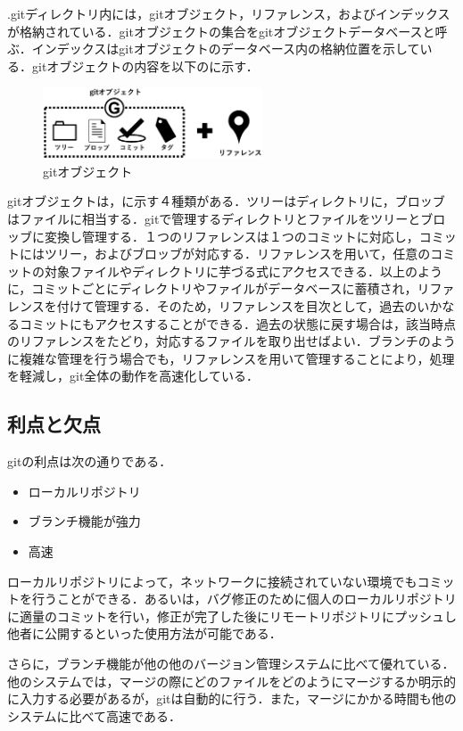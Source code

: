\documentclass[a4j,9pt,twocolumn]{jsarticle}
\begin{document}
.gitディレクトリ内には，gitオブジェクト，リファレンス，およびインデックスが格納されている．gitオブジェクトの集合をgitオブジェクトデータベースと呼ぶ．インデックスはgitオブジェクトのデータベース内の格納位置を示している．gitオブジェクトの内容を以下のに示す．

\begin{figure}[h]
\centering
\includegraphics[width=65mm]{img/git_obj2.eps}
\caption{gitオブジェクト}
\label{object2}
\end{figure}

gitオブジェクトは，に示す４種類がある．ツリーはディレクトリに，ブロッブはファイルに相当する．gitで管理するディレクトリとファイルをツリーとブロッブに変換し管理する．１つのリファレンスは１つのコミットに対応し，コミットにはツリー，およびブロッブが対応する．リファレンスを用いて，任意のコミットの対象ファイルやディレクトリに芋づる式にアクセスできる．以上のように，コミットごとにディレクトリやファイルがデータベースに蓄積され，リファレンスを付けて管理する．そのため，リファレンスを目次として，過去のいかなるコミットにもアクセスすることができる．過去の状態に戻す場合は，該当時点のリファレンスをたどり，対応するファイルを取り出せばよい．ブランチのように複雑な管理を行う場合でも，リファレンスを用いて管理することにより，処理を軽減し，git全体の動作を高速化している．

\subsection{利点と欠点}
gitの利点は次の通りである．

\begin{itemize}
\item ローカルリポジトリ
\item ブランチ機能が強力
\item 高速
\end{itemize}

ローカルリポジトリによって，ネットワークに接続されていない環境でもコミットを行うことができる．あるいは，バグ修正のために個人のローカルリポジトリに適量のコミットを行い，修正が完了した後にリモートリポジトリにプッシュし他者に公開するといった使用方法が可能である．

さらに，ブランチ機能が他の他のバージョン管理システムに比べて優れている．他のシステムでは，マージの際にどのファイルをどのようにマージするか明示的に入力する必要があるが，gitは自動的に行う．また，マージにかかる時間も他のシステムに比べて高速である．
\end{document}
